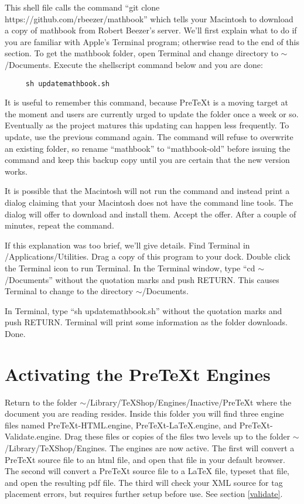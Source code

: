 \documentclass[11pt, oneside]{article}   	%
\begin{document}
This shell  file calls the command 
     ``git clone https://github.com/rbeezer/mathbook''
which tells your Macintosh to download a copy of mathbook from Robert Beezer's server. We'll first explain what to do if you are familiar with Apple's Terminal program; otherwise read to the end of this section. To get  the mathbook folder,  open Terminal and change directory to $\sim$/Documents. Execute the shellscript command 
below and you are done:
\begin{verbatim}
     sh updatemathbook.sh
\end{verbatim}

\newpage
It is useful to remember this command, because PreTeXt is a moving target at the moment and users are currently urged to update the folder once a week or so. Eventually as the project matures this updating can happen less frequently. To update, use the previous command again. The command  will refuse to overwrite an existing folder, so rename ``mathbook'' to ``mathbook-old'' before issuing the command and keep this backup copy until you are certain that the new version works.

It is possible that the Macintosh will not run the command and instead print a dialog claiming that your Macintosh does not have the command line tools. The dialog will offer to download and install them. Accept the offer. After a couple of minutes, repeat the command.

If this explanation was too brief, we'll give details.
Find Terminal in /Applications/Utilities. Drag a copy of this program to your dock. Double click the Terminal  icon to run Terminal.   In the Terminal window, type  ``cd $\sim$/Documents'' without the quotation marks and push RETURN. This causes Terminal to change to the directory $\sim$/Documents.

In Terminal, type ``sh updatemathbook.sh'' without the quotation marks and push RETURN. Terminal will print some information as the folder downloads. Done.


\section{Activating the PreTeXt Engines}

Return to the folder $\sim$/Library/TeXShop/Engines/Inactive/PreTeXt where the document you are reading resides. Inside this folder you will find three engine files named PreTeXt-HTML.engine, PreTeXt-LaTeX.engine, and PreTeXt-Validate.engine.
Drag these files or copies of the files two levels up to the folder $\sim$/Library/TeXShop/Engines. The engines are now active. The first will convert a PreTeXt source file to an html file, and  open that file in your default browser. The second will convert a PreTeXt source file to a LaTeX file, typeset that file, and open the resulting pdf file. The third will check your XML source for tag placement errors, but requires further setup before use. See section \ref{validate}.
\end{document}
